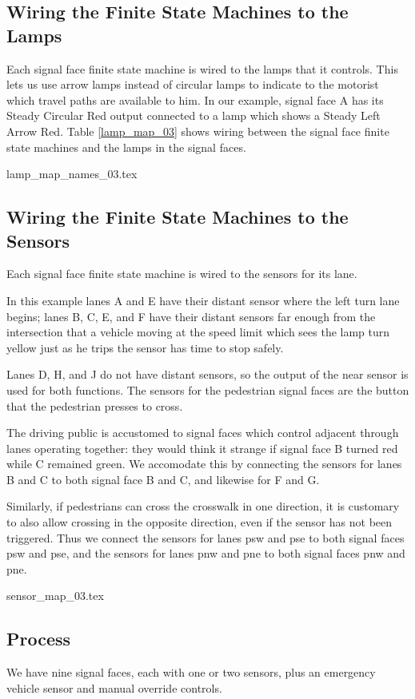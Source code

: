 \documentclass[letterpaper,twoside]{article}
\begin{document}
\subsection{Wiring the Finite State Machines to the Lamps}

Each signal face finite state machine is wired to the lamps that
it controls.  This lets us use arrow lamps instead of circular lamps
to indicate to the motorist which travel paths are available to him.
In our example, signal face A has its Steady Circular Red output
connected to a lamp which shows a Steady Left Arrow Red.
Table \ref{lamp_map_03} shows wiring between the signal face finite state
machines and the lamps in the signal faces.

 {lamp_map_names_03.tex}

\subsection{Wiring the Finite State Machines to the Sensors}

Each signal face finite state machine is wired to the sensors
for its lane.

In this example lanes A and E have their distant sensor where
the left turn lane begins; lanes B, C, E, and F have their
distant sensors far enough from the intersection that a vehicle
moving at the speed limit which sees the lamp turn yellow
just as he trips the sensor has time to stop safely.

Lanes D, H, and J do not have distant sensors, so the output
of the near sensor is used for both functions.  The sensors
for the pedestrian signal faces are the button that the pedestrian presses
to cross.

The driving public is accustomed to signal faces which control
adjacent through lanes operating together: they would think it strange
if signal face B turned red while C remained green.  We accomodate this
by connecting the sensors for lanes B and C to both signal face B
and C, and likewise for F and G.

Similarly, if pedestrians can cross the crosswalk in one direction,
it is customary to also allow crossing in the opposite direction,
even if the sensor has not been triggered.  Thus we connect the sensors
for lanes psw and pse to both signal faces psw and pse, and the sensors
for lanes pnw and pne to both signal faces pnw and pne.

 {sensor_map_03.tex}

\subsection{Process}
We have nine signal faces, each with one or two sensors, plus an emergency
vehicle sensor and manual override controls.
\end{document}
